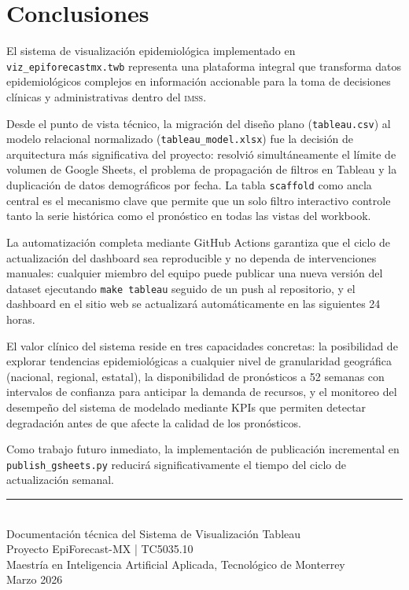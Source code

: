 \documentclass[12pt, letterpaper]{article}
\newcommand{\imss}{\textnormal{\textsc{imss}}}
\begin{document}
\newpage
\section{Conclusiones}\label{sec:conclusiones}

El sistema de visualización epidemiológica implementado en \texttt{viz\_epiforecastmx.twb} representa una plataforma integral que transforma datos epidemiológicos complejos en información accionable para la toma de decisiones clínicas y administrativas dentro del {\imss}.

Desde el punto de vista técnico, la migración del diseño plano (\texttt{tableau.csv}) al modelo relacional normalizado (\texttt{tableau\_model.xlsx}) fue la decisión de arquitectura más significativa del proyecto: resolvió simultáneamente el límite de volumen de Google Sheets, el problema de propagación de filtros en Tableau y la duplicación de datos demográficos por fecha. La tabla \texttt{scaffold} como ancla central es el mecanismo clave que permite que un solo filtro interactivo controle tanto la serie histórica como el pronóstico en todas las vistas del workbook.

La automatización completa mediante GitHub Actions garantiza que el ciclo de actualización del dashboard sea reproducible y no dependa de intervenciones manuales: cualquier miembro del equipo puede publicar una nueva versión del dataset ejecutando \texttt{make tableau} seguido de un push al repositorio, y el dashboard en el sitio web se actualizará automáticamente en las siguientes 24 horas.

El valor clínico del sistema reside en tres capacidades concretas: la posibilidad de explorar tendencias epidemiológicas a cualquier nivel de granularidad geográfica (nacional, regional, estatal), la disponibilidad de pronósticos a 52 semanas con intervalos de confianza para anticipar la demanda de recursos, y el monitoreo del desempeño del sistema de modelado mediante KPIs que permiten detectar degradación antes de que afecte la calidad de los pronósticos.

Como trabajo futuro inmediato, la implementación de publicación incremental en \texttt{publish\_gsheets.py} reducirá significativamente el tiempo del ciclo de actualización semanal.

\vspace{1.0cm}
\begin{center}
\textcolor{coolgray}{\rule{0.5\textwidth}{0.4pt}}\\[0.3cm]
{\small\textcolor{coolgray}{Documentación técnica del Sistema de Visualización Tableau}}\\
{\small\textcolor{coolgray}{Proyecto EpiForecast-MX | TC5035.10}}\\
{\small\textcolor{coolgray}{Maestría en Inteligencia Artificial Aplicada, Tecnológico de Monterrey}}\\
{\small\textcolor{coolgray}{Marzo 2026}}
\end{center}
\end{document}
